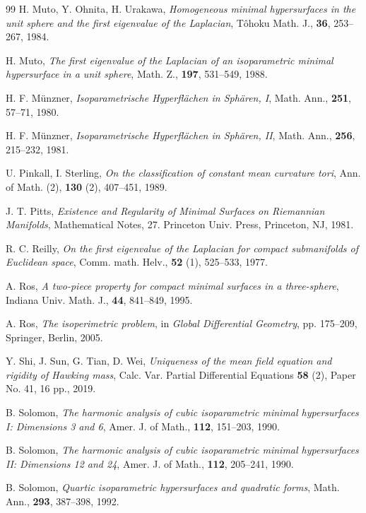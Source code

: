 \documentclass[a4, 12pt]{amsart}
\numberwithin{equation}{section} \numberwithin{equation}{section}
\begin{document}
\begin{thebibliography}{99}
H. Muto, Y. Ohnita, H. Urakawa, \textit{Homogeneous minimal hypersurfaces in the unit sphere and the first eigenvalue of the Laplacian}, T\^{o}hoku Math. J., {\bf 36}, 253--267, 1984.

H. Muto, \textit{The first eigenvalue of the Laplacian of an isoparametric minimal hypersurface in a unit sphere}, Math. Z., {\bf 197}, 531--549, 1988.

H. F. M\"{u}nzner, \textit{Isoparametrische Hyperfl\"{a}chen in Sph\"{a}ren, I}, Math. Ann., {\bf 251}, 57--71, 1980.

H. F. M\"{u}nzner, \textit{Isoparametrische Hyperfl\"{a}chen in Sph\"{a}ren, II}, Math. Ann., {\bf 256}, 215--232, 1981.

U. Pinkall, I. Sterling, \textit{On the classification of constant mean curvature tori}, Ann. of Math. (2), {\bf 130} (2), 407--451, 1989.

J. T. Pitts, \textit{Existence and Regularity of Minimal Surfaces on Riemannian Manifolds}, Mathematical Notes, 27. Princeton Univ. Press, Princeton, NJ, 1981.

R. C. Reilly, \textit{On the first eigenvalue of the Laplacian for compact submanifolds of Euclidean space}, Comm. math. Helv., {\bf 52} (1), 525--533, 1977.

A. Ros, \textit{A two-piece property for compact minimal surfaces in a three-sphere}, Indiana Univ. Math. J., {\bf 44}, 841--849, 1995.

A. Ros, \textit{The isoperimetric problem}, in \textit{Global Differential Geometry}, pp. 175--209, Springer, Berlin, 2005.

Y. Shi, J. Sun, G. Tian, D. Wei, \textit{Uniqueness of the mean field equation and rigidity of Hawking mass}, Calc. Var. Partial Differential Equations {\bf 58} (2), Paper No. 41, 16 pp., 2019.

B. Solomon, \textit{The harmonic analysis of cubic isoparametric minimal hypersurfaces I: Dimensions 3 and 6}, Amer. J. of Math., {\bf 112}, 151--203, 1990.

B. Solomon, \textit{The harmonic analysis of cubic isoparametric minimal hypersurfaces II: Dimensions 12 and 24}, Amer. J. of Math., {\bf 112}, 205--241, 1990.

B. Solomon, \textit{Quartic isoparametric hypersurfaces and quadratic forms}, Math. Ann., {\bf 293}, 387--398, 1992.


\end{thebibliography}
\end{document}
